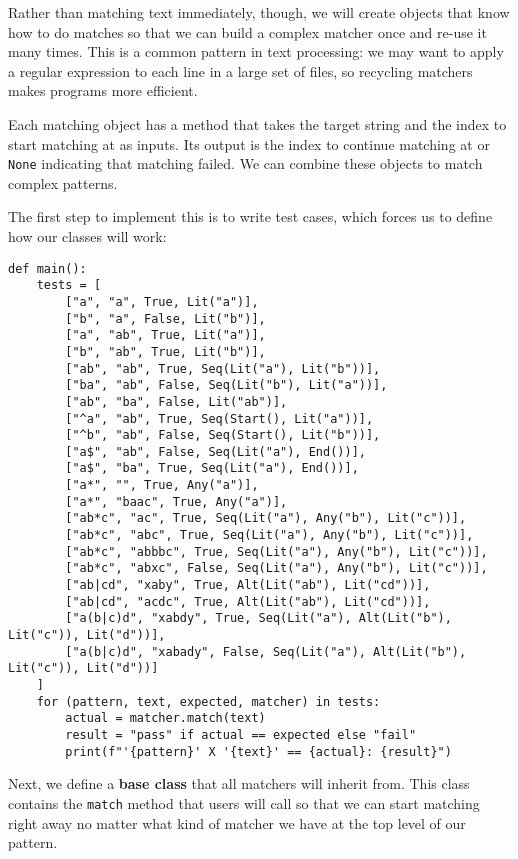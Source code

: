 \documentclass{scrbook}
\newcommand{\glossref}[1]{\textbf{#1}}
\begin{document}
Rather than matching text immediately,
though,
we will create objects that know how to do matches
so that we can build a complex matcher once and re-use it many times.
This is a common pattern in text processing:
we may want to apply a regular expression to each line in a large set of files,
so recycling matchers makes programs more efficient.


Each matching object has a method
that takes the target string and the index to start matching at as inputs.
Its output is the index to continue matching at
or \texttt{None} indicating that matching failed.
We can combine these objects to match complex patterns.


The first step to implement this is to write test cases,
which forces us to define how our classes will work:


\begin{lstlisting}[frame=single,frameround=tttt]
def main():
    tests = [
        ["a", "a", True, Lit("a")],
        ["b", "a", False, Lit("b")],
        ["a", "ab", True, Lit("a")],
        ["b", "ab", True, Lit("b")],
        ["ab", "ab", True, Seq(Lit("a"), Lit("b"))],
        ["ba", "ab", False, Seq(Lit("b"), Lit("a"))],
        ["ab", "ba", False, Lit("ab")],
        ["^a", "ab", True, Seq(Start(), Lit("a"))],
        ["^b", "ab", False, Seq(Start(), Lit("b"))],
        ["a$", "ab", False, Seq(Lit("a"), End())],
        ["a$", "ba", True, Seq(Lit("a"), End())],
        ["a*", "", True, Any("a")],
        ["a*", "baac", True, Any("a")],
        ["ab*c", "ac", True, Seq(Lit("a"), Any("b"), Lit("c"))],
        ["ab*c", "abc", True, Seq(Lit("a"), Any("b"), Lit("c"))],
        ["ab*c", "abbbc", True, Seq(Lit("a"), Any("b"), Lit("c"))],
        ["ab*c", "abxc", False, Seq(Lit("a"), Any("b"), Lit("c"))],
        ["ab|cd", "xaby", True, Alt(Lit("ab"), Lit("cd"))],
        ["ab|cd", "acdc", True, Alt(Lit("ab"), Lit("cd"))],
        ["a(b|c)d", "xabdy", True, Seq(Lit("a"), Alt(Lit("b"), Lit("c")), Lit("d"))],
        ["a(b|c)d", "xabady", False, Seq(Lit("a"), Alt(Lit("b"), Lit("c")), Lit("d"))]
    ]
    for (pattern, text, expected, matcher) in tests:
        actual = matcher.match(text)
        result = "pass" if actual == expected else "fail"
        print(f"'{pattern}' X '{text}' == {actual}: {result}")
\end{lstlisting}



Next,
we define a \glossref{base class} that all matchers will inherit from.
This class contains the \texttt{match} method that users will call
so that we can start matching right away
no matter what kind of matcher we have at the top level of our pattern.
\end{document}
